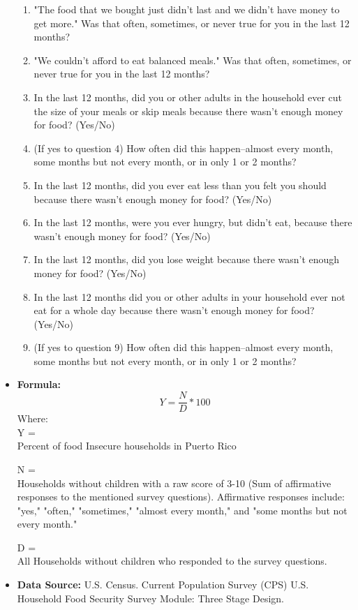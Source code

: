 \documentclass[12pt,letterpaper]{report}
\begin{document}
\begin{itemize}
\begin{enumerate}
  \item "The food that we bought just didn't last and we didn't have money to get more." Was that often, sometimes, or never true for you in the last 12 months?
  \item "We couldn't afford to eat balanced meals." Was that often, sometimes, or never true for you in the last 12 months?
  \item In the last 12 months, did you or other adults in the household ever cut the size of your meals or skip meals because there wasn't enough money for food? (Yes/No)
  \item (If yes to question 4) How often did this happen--almost every month, some months but not every month, or in only 1 or 2 months?
  \item In the last 12 months, did you ever eat less than you felt you should because there wasn't enough money for food? (Yes/No)
  \item In the last 12 months, were you ever hungry, but didn't eat, because there wasn't enough money for food? (Yes/No)
  \item In the last 12 months, did you lose weight because there wasn't enough money for food? (Yes/No)
  \item In the last 12 months did you or other adults in your household ever not eat for a whole day because there wasn't enough money for food? (Yes/No)
  \item (If yes to question 9) How often did this happen--almost every month, some months but not every month, or in only 1 or 2 months?
\end{enumerate}
		\item \textbf{Formula:} 
			\begin{equation}
				Y = \frac{N}{D} *100
			\end{equation}
Where: \\
			Y = \\Percent of food Insecure households in Puerto Rico
			
			N = \\Households without children with a raw score of 3-10 (Sum of affirmative responses to the mentioned survey questions). Affirmative responses include: "yes," "often," "sometimes," "almost every month," and "some months but not every month." 
			
			D = \\All Households without children who responded to the survey questions.
			
		\item \textbf{Data Source:}  U.S. Census. Current Population Survey (CPS) U.S. Household Food Security Survey Module: Three Stage Design.
	\end{itemize}
\end{document}
